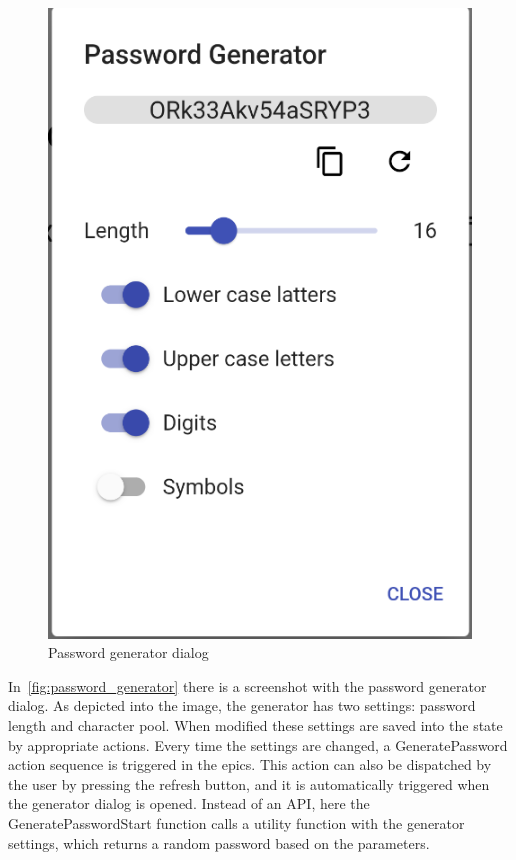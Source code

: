 \documentclass[a4paper,12pt]{report}
\begin{document}
\begin{figure}[H]
    \centering
    \includegraphics[scale=0.33]{images/app/password_generator.png}
    \caption{Password generator dialog}\label{fig:password_generator}
\end{figure}

In~\autoref{fig:password_generator} there is a screenshot with the password
generator dialog. As depicted into the image, the generator has two settings:
password length and character pool. When modified these settings are saved into
the state by appropriate actions. Every time the settings are changed, a
GeneratePassword action sequence is triggered in the epics. This action can
also be dispatched by the user by pressing the refresh button, and it is
automatically triggered when the generator dialog is opened. Instead of an API,
here the GeneratePasswordStart function calls a utility function with the
generator settings, which returns a random password based on the parameters.
\end{document}
